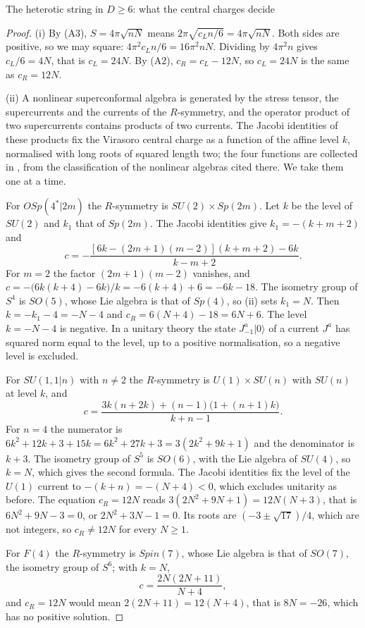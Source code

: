 \begin{closurebox}{The heterotic string in $D\ge6$: what the central charges decide}
\begin{proof}
(i) By (A3), $S=4\pi\sqrt{nN}$ means $2\pi\sqrt{c_Ln/6}=4\pi\sqrt{nN}$. Both sides are positive, so we may square: $4\pi^2c_Ln/6=16\pi^2nN$. Dividing by $4\pi^2n$ gives $c_L/6=4N$, that is $c_L=24N$. By (A2), $c_R=c_L-12N$, so $c_L=24N$ is the same as $c_R=12N$.

(ii) A nonlinear superconformal algebra is generated by the stress tensor, the supercurrents and the currents of the $R$-symmetry, and the operator product of two supercurrents contains products of two currents. The Jacobi identities of these products fix the Virasoro central charge as a function of the affine level $k$, normalised with long roots of squared length two; the four functions are collected in \cite[Table~2]{KLS07}, from the classification of the nonlinear algebras cited there. We take them one at a time.

For $OSp(4^*|2m)$ the $R$-symmetry is $SU(2)\times Sp(2m)$. Let $k$ be the level of $SU(2)$ and $k_1$ that of $Sp(2m)$. The Jacobi identities give $k_1=-(k+m+2)$ and
\[
c=-\frac{[6k-(2m+1)(m-2)](k+m+2)-6k}{k-m+2}.
\]
For $m=2$ the factor $(2m+1)(m-2)$ vanishes, and $c=-\big(6k(k+4)-6k\big)/k=-6(k+4)+6=-6k-18$. The isometry group of $S^4$ is $SO(5)$, whose Lie algebra is that of $Sp(4)$, so (ii) sets $k_1=N$. Then $k=-k_1-4=-N-4$ and $c_R=6(N+4)-18=6N+6$. The level $k=-N-4$ is negative. In a unitary theory the state $J^a_{-1}|0\rangle$ of a current $J^a$ has squared norm equal to the level, up to a positive normalisation, so a negative level is excluded.

For $SU(1,1|n)$ with $n\ne2$ the $R$-symmetry is $U(1)\times SU(n)$ with $SU(n)$ at level $k$, and
\[
c=\frac{3k(n+2k)+(n-1)\big(1+(n+1)k\big)}{k+n-1}.
\]
For $n=4$ the numerator is $6k^2+12k+3+15k=6k^2+27k+3=3(2k^2+9k+1)$ and the denominator is $k+3$. The isometry group of $S^5$ is $SO(6)$, with the Lie algebra of $SU(4)$, so $k=N$, which gives the second formula. The Jacobi identities fix the level of the $U(1)$ current to $-(k+n)=-(N+4)<0$, which excludes unitarity as before. The equation $c_R=12N$ reads $3(2N^2+9N+1)=12N(N+3)$, that is $6N^2+9N-3=0$, or $2N^2+3N-1=0$. Its roots are $(-3\pm\sqrt{17})/4$, which are not integers, so $c_R\ne12N$ for every $N\ge1$.

For $F(4)$ the $R$-symmetry is $Spin(7)$, whose Lie algebra is that of $SO(7)$, the isometry group of $S^6$; with $k=N$,
\[
c=\frac{2N(2N+11)}{N+4},
\]
and $c_R=12N$ would mean $2(2N+11)=12(N+4)$, that is $8N=-26$, which has no positive solution.


\end{proof}
\end{closurebox}
